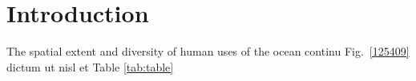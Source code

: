 \section{Introduction}
\label{introduction}

The spatial extent and diversity of human uses of the ocean continu Fig.~\ref{125409} dictum ut nisl et Table \ref{tab:table}
